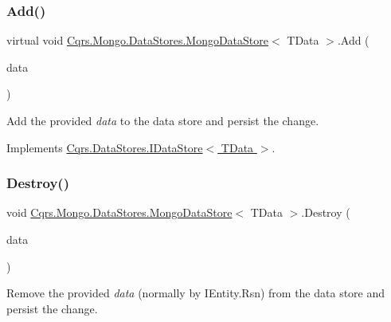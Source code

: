 \subsubsection{\texorpdfstring{Add()}{Add()}\hspace{0.1cm}{\footnotesize\ttfamily [2/2]}}
{\footnotesize\ttfamily virtual void \hyperlink{classCqrs_1_1Mongo_1_1DataStores_1_1MongoDataStore}{Cqrs.\+Mongo.\+Data\+Stores.\+Mongo\+Data\+Store}$<$ T\+Data $>$.Add (\begin{DoxyParamCaption}\item[{I\+Enumerable$<$ T\+Data $>$}]{data }\end{DoxyParamCaption})\hspace{0.3cm}{\ttfamily [virtual]}}



Add the provided {\itshape data}  to the data store and persist the change. 



Implements \hyperlink{interfaceCqrs_1_1DataStores_1_1IDataStore_a906f3f2f80db7a549a4170eca4653e26_a906f3f2f80db7a549a4170eca4653e26}{Cqrs.\+Data\+Stores.\+I\+Data\+Store$<$ T\+Data $>$}.

\mbox{\label{classCqrs_1_1Mongo_1_1DataStores_1_1MongoDataStore_af97319aef1f0484666d9ea12578b8df9_af97319aef1f0484666d9ea12578b8df9}} 
\subsubsection{\texorpdfstring{Destroy()}{Destroy()}}
{\footnotesize\ttfamily void \hyperlink{classCqrs_1_1Mongo_1_1DataStores_1_1MongoDataStore}{Cqrs.\+Mongo.\+Data\+Stores.\+Mongo\+Data\+Store}$<$ T\+Data $>$.Destroy (\begin{DoxyParamCaption}\item[{T\+Data}]{data }\end{DoxyParamCaption})}



Remove the provided {\itshape data}  (normally by I\+Entity.\+Rsn) from the data store and persist the change. 



